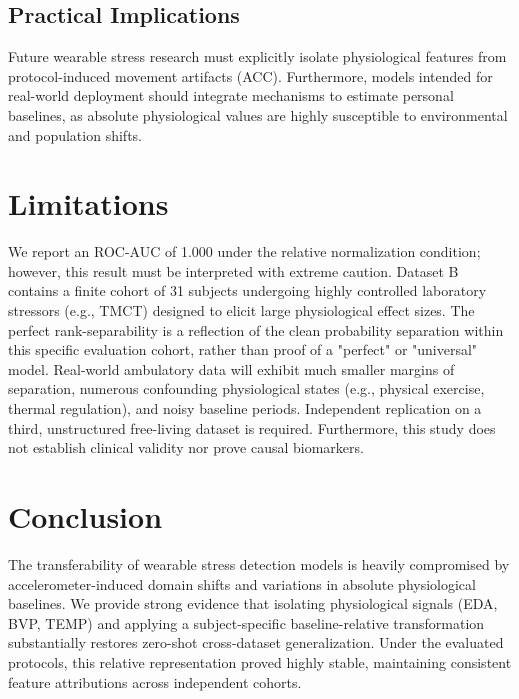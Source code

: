 \documentclass[journal]{IEEEtran}
\begin{document}
\subsection{Practical Implications}
Future wearable stress research must explicitly isolate physiological features from protocol-induced movement artifacts (ACC). Furthermore, models intended for real-world deployment should integrate mechanisms to estimate personal baselines, as absolute physiological values are highly susceptible to environmental and population shifts.

\section{Limitations}
We report an ROC-AUC of 1.000 under the relative normalization condition; however, this result must be interpreted with extreme caution. Dataset B contains a finite cohort of 31 subjects undergoing highly controlled laboratory stressors (e.g., TMCT) designed to elicit large physiological effect sizes. The perfect rank-separability is a reflection of the clean probability separation within this specific evaluation cohort, rather than proof of a "perfect" or "universal" model. Real-world ambulatory data will exhibit much smaller margins of separation, numerous confounding physiological states (e.g., physical exercise, thermal regulation), and noisy baseline periods. Independent replication on a third, unstructured free-living dataset is required. Furthermore, this study does not establish clinical validity nor prove causal biomarkers.

\section{Conclusion}
The transferability of wearable stress detection models is heavily compromised by accelerometer-induced domain shifts and variations in absolute physiological baselines. We provide strong evidence that isolating physiological signals (EDA, BVP, TEMP) and applying a subject-specific baseline-relative transformation substantially restores zero-shot cross-dataset generalization. Under the evaluated protocols, this relative representation proved highly stable, maintaining consistent feature attributions across independent cohorts.
\end{document}
